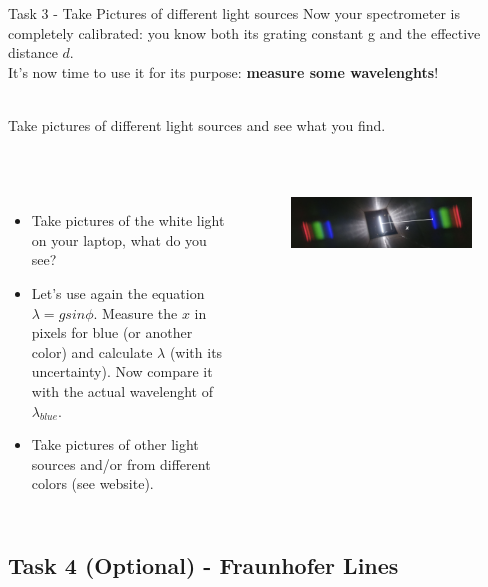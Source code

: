 \documentclass[9pt, xcolor=dvipsnames]{beamer}
\newcommand{\hreff}[3][blue]{\href{#2}{\color{#1}{#3}}}%
\begin{document}
\begin{frame}{Task 3 -  Take Pictures of different light sources}	
Now your spectrometer is completely calibrated: you know both its grating constant g and the effective distance $d$. \\
It's now time to use it for its purpose: \textbf{measure some wavelenghts}!

~\\

	Take pictures of	 different light sources and see what you find.

~\\
	\begin{columns}
	\begin{itemize}
		\item Take pictures of the white light on your laptop, what do you see?

		\item Let's use again the equation $\lambda = g sin \phi$. Measure the $x$ in pixels for blue (or another color) and calculate $\lambda$ (with its uncertainty). Now compare it with the actual wavelenght of $\lambda_{blue}$.
		
		\item Take pictures of other light sources and/or from different colors (see \hreff{https://www.ledr.com/colours/multi.htm}{this} website).
	\end{itemize}
	\begin{figure}
		\begin{centering}
			\centering
			\includegraphics[width=1 \textwidth]{Figures/laptop.png}
		\end{centering}
		\end{figure}
\end{columns}
	\end{frame}

\subsection{ Task 4 (Optional) - Fraunhofer Lines}
\end{document}
